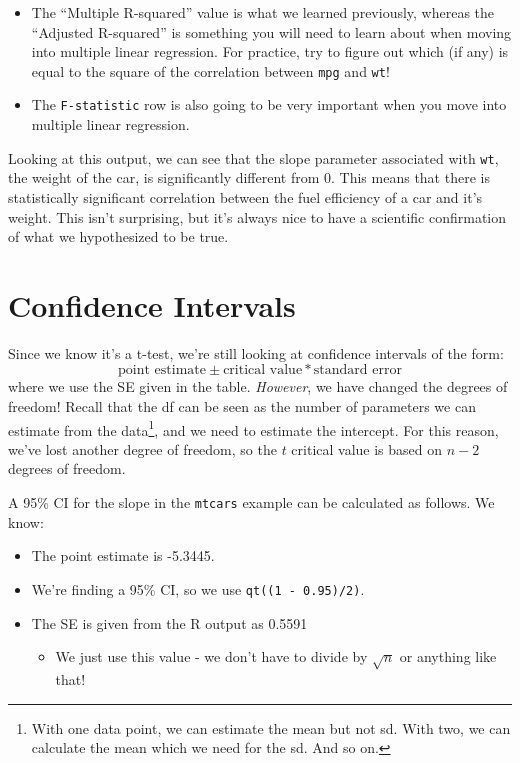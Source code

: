 \documentclass[
  letterpaper,
  DIV=11,
  numbers=noendperiod,
  oneside]{scrreprt}
\providecommand{\tightlist}{%
  \setlength{\itemsep}{0pt}\setlength{\parskip}{0pt}}\usepackage{longtable,booktabs,array}
\begin{document}
\begin{itemize}
  \begin{itemize}
  \tightlist
  \item
    The ``Multiple R-squared'' value is what we learned previously,
    whereas the ``Adjusted R-squared'' is something you will need to
    learn about when moving into multiple linear regression. For
    practice, try to figure out which (if any) is equal to the square of
    the correlation between \texttt{mpg} and \texttt{wt}!
  \item
    The \texttt{F-statistic} row is also going to be very important when
    you move into multiple linear regression.
  \end{itemize}
\end{itemize}

Looking at this output, we can see that the slope parameter associated
with \texttt{wt}, the weight of the car, is significantly different from
0. This means that there is statistically significant correlation
between the fuel efficiency of a car and it's weight. This isn't
surprising, but it's always nice to have a scientific confirmation of
what we hypothesized to be true.

\hypertarget{confidence-intervals-3}{%
\section{Confidence Intervals}\label{confidence-intervals-3}}

Since we know it's a t-test, we're still looking at confidence intervals
of the form: \[
\text{point estimate}\pm\text{critical value}*\text{standard error} 
\] where we use the SE given in the table. \emph{However}, we have
changed the degrees of freedom! Recall that the df can be seen as the
number of parameters we can estimate from the data\footnote{With one
  data point, we can estimate the mean but not sd. With two, we can
  calculate the mean which we need for the sd. And so on.}, and we need
to estimate the intercept. For this reason, we've lost another degree of
freedom, so the \(t\) critical value is based on \(n-2\) degrees of
freedom.

A 95\% CI for the slope in the \texttt{mtcars} example can be calculated
as follows. We know:

\begin{itemize}
\tightlist
\item
  The point estimate is -5.3445.
\item
  We're finding a 95\% CI, so we use \texttt{qt((1\ -\ 0.95)/2)}.
\item
  The SE is given from the R output as 0.5591

  \begin{itemize}
  \tightlist
  \item
    We just use this value - we don't have to divide by \(\sqrt{n}\) or
    anything like that!
  \end{itemize}
\end{itemize}
\end{document}
